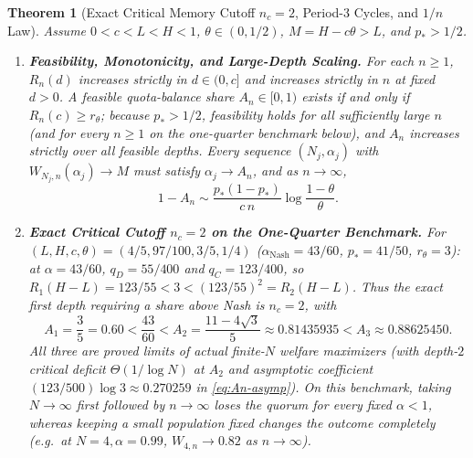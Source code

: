 \documentclass[11pt,reqno]{amsart}
\newtheorem{theorem}{Theorem}[section]
\theoremstyle{definition}
\theoremstyle{remark}
\begin{document}
\begin{theorem}[Exact Critical Memory Cutoff $n_c = 2$, Period-3 Cycles, and $1/n$ Law]\label{thm:fund-cutoff}
Assume $0 < c < L < H < 1$, $\theta \in (0,1/2)$, $M = H - c\theta > L$, and $p_* > 1/2$.
\begin{enumerate}
  \item \textbf{Feasibility, Monotonicity, and Large-Depth Scaling.} For each $n \ge 1$, $R_n(d)$ increases strictly in $d \in (0, c]$ and increases strictly in $n$ at fixed $d > 0$. A feasible quota-balance share $A_n \in [0, 1)$ exists if and only if $R_n(c) \ge r_\theta$; because $p_* > 1/2$, feasibility holds for all sufficiently large $n$ (and for every $n \ge 1$ on the one-quarter benchmark below), and $A_n$ increases strictly over all feasible depths. Every sequence $(N_j, \alpha_j)$ with $W_{N_j, n}(\alpha_j) \to M$ must satisfy $\alpha_j \to A_n$, and as $n \to \infty$,
  \begin{equation}\label{eq:An-asymp}
    1 - A_n \sim \frac{p_*(1-p_*)}{c\,n}\log\frac{1-\theta}{\theta}.
  \end{equation}

  \item \textbf{Exact Critical Cutoff $n_c = 2$ on the One-Quarter Benchmark.} For $(L,H,c,\theta) = (4/5, 97/100, 3/5, 1/4)$ ($\alpha_{\mathrm{Nash}} = 43/60$, $p_* = 41/50$, $r_\theta = 3$): at $\alpha = 43/60$, $q_D = 55/400$ and $q_C = 123/400$, so $R_1(H-L) = 123/55 < 3 < (123/55)^2 = R_2(H-L)$. Thus the exact first depth requiring a share above Nash is \textbf{$n_c = 2$}, with
  \[
    A_1 = \frac{3}{5} = 0.60 < \frac{43}{60} < A_2 = \frac{11 - 4\sqrt{3}}{5} \approx 0.81435935 < A_3 \approx 0.88625450.
  \]
  All three are proved limits of actual finite-$N$ welfare maximizers (with depth-$2$ critical deficit $\Theta(1/\log N)$ at $A_2$ and asymptotic coefficient $(123/500)\log 3 \approx 0.270259$ in \eqref{eq:An-asymp}). On this benchmark, taking $N \to \infty$ first followed by $n \to \infty$ loses the quorum for every fixed $\alpha < 1$, whereas keeping a small population fixed changes the outcome completely (e.g.\ at $N = 4, \alpha = 0.99$, $W_{4,n} \to 0.82$ as $n\to\infty$).


\end{enumerate}
\end{theorem}
\end{document}
